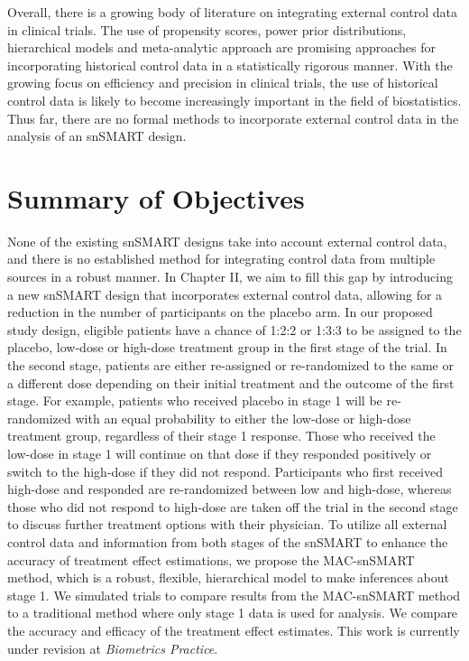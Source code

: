 Overall, there is a growing body of literature on integrating external control data in clinical trials. The use of propensity scores, power prior distributions, hierarchical models and meta-analytic approach are promising approaches for incorporating historical control data in a statistically rigorous manner. With the growing focus on efficiency and precision in clinical trials, the use of historical control data is likely to become increasingly important in the field of biostatistics. Thus far, there are no formal methods to incorporate external control data in the analysis of an snSMART design.

\section{Summary of Objectives}
None of the existing snSMART designs take into account external control data, and there is no established method for integrating control data from multiple sources in a robust manner. In Chapter II, we aim to fill this gap by introducing a new snSMART design that incorporates external control data, allowing for a reduction in the number of participants on the placebo arm. In our proposed study design, eligible patients have a chance of 1:2:2 or 1:3:3 to be assigned to the placebo, low-dose or high-dose treatment group in the first stage of the trial. In the second stage, patients are either re-assigned or re-randomized to the same or a different dose depending on their initial treatment and the outcome of the first stage. For example, patients who received placebo in stage 1 will be re-randomized with an equal probability to either the low-dose or high-dose treatment group, regardless of their stage 1 response. Those who received the low-dose in stage 1 will continue on that dose if they responded positively or switch to the high-dose if they did not respond. Participants who first received high-dose and responded are re-randomized between low and high-dose, whereas those who did not respond to high-dose are taken off the trial in the second stage to discuss further treatment options with their physician. To utilize all external control data and information from both stages of the snSMART to enhance the accuracy of treatment effect estimations, we propose the MAC-snSMART method, which is a robust, flexible, hierarchical model to make inferences about stage 1. We simulated trials to compare results from the MAC-snSMART method to a traditional method where only stage 1 data is used for analysis. We compare the accuracy and efficacy of the treatment effect estimates. This work is currently under revision at \textit{Biometrics Practice}.

